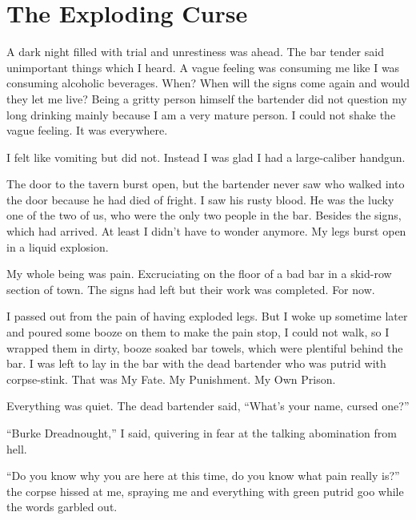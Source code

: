 \chapter{The Exploding Curse}



A dark night filled with trial and unrestiness was ahead. The bar
tender said unimportant things which I heard. A vague feeling was
consuming me like I was consuming alcoholic beverages. When? When
will the signs come again and would they let me live? Being a
gritty person himself the bartender did not question my long
drinking mainly because I am a very mature person. I could not
shake the vague feeling. It was everywhere.



I felt like vomiting but did not. Instead I was glad I had a
large-caliber handgun.



The door to the tavern burst open, but the bartender never saw who
walked into the door because he had died of fright. I saw his rusty
blood. He was the lucky one of the two of us, who were the only two
people in the bar. Besides the signs, which had arrived. At least I
didn't have to wonder anymore. My legs burst open in a liquid
explosion.



My whole being was pain. Excruciating on the floor of a bad bar in
a skid-row section of town. The signs had left but their work was
completed. For now.



I passed out from the pain of having exploded legs. But I woke up
sometime later and poured some booze on them to make the pain stop,
I could not walk, so I wrapped them in dirty, booze soaked bar
towels, which were plentiful behind the bar. I was left to lay in
the bar with the dead bartender who was putrid with corpse-stink.
That was My Fate. My Punishment. My Own Prison.



Everything was quiet. The dead bartender said, ``What's your name,
cursed one?''



``Burke Dreadnought,'' I said, quivering in fear at the talking
abomination from hell.



``Do you know why you are here at this time, do you know what pain
really is?'' the corpse hissed at me, spraying me and everything
with green putrid goo while the words garbled out.



